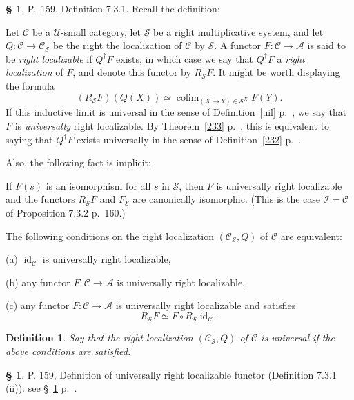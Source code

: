 \documentclass[12pt]{article}%
\newtheorem{df}[thm]{Definition}%
\theoremstyle{remark}
\theoremstyle{definition}
\newtheorem{s}[thm]{\S}%
\newcommand{\nn}{\noindent}
\newcommand{\cc}{\mathcal}
\newcommand{\A}{\mathcal A}
\newcommand{\C}{\mathcal C}
\newcommand{\U}{\mathcal U}
\DeclareMathOperator*{\colim}{colim}
\DeclareMathOperator{\id}{id}
\begin{document}
\begin{s}\label{durl} 
P.~159, Definition 7.3.1. Recall the definition: 

Let $\C$ be a $\U$-small category, %
let $\cc S$ be a right multiplicative system, and let $Q:\C\to\C_{\cc S}$ be the right the localization of $\C$ by $\cc S$. A functor $F:\C\to\A$ is said to be {\em right localizable} if $Q^\dagger F$ exists, in which case we say that $Q^\dagger F$ a {\em right localization} of $F$, and denote this functor by $R_{\cc S}F$. It might be worth displaying the formula 
$$
(R_{\cc S}F)(Q(X))\simeq\colim_{(X\to Y)\in\cc S^X}F(Y).
$$ 
If this inductive limit is universal in the sense of Definition~\ref{uil} p.~\pageref{uil}, we say that $F$ is {\em universally} right localizable.  By Theorem~\ref{233} p.~\pageref{233}, this is equivalent to saying that $Q^\dagger F$ exists universally in the sense of Definition~\ref{232} p.~\pageref{232}. 

Also, the following fact is implicit:

If $F(s)$ is an isomorphism for all $s$ in $\cc S$, then $F$ is universally right localizable and the functors $R_{\cc S}F$ and $F_{\cc S}$ are canonically isomorphic. (This is the case $\cc I=\C$ of Proposition 7.3.2 p.~160.)

The following conditions on the right localization $(\C_{\cc S},Q)$ of $\C$ are equivalent: 

\noindent(a) $\id_\C$ is universally right localizable, 

\noindent(b) any functor $F:\C\to\A$ is universally right localizable, 

\noindent(c) any functor $F:\C\to\A$ is universally right localizable and satisfies 
$$
R_{\cc S}F\simeq F\circ R_{\cc S}\id_\C.
$$

\begin{df}\label{url2}
Say that the right localization $(\C_{\cc S},Q)$ of $\C$ is {\em universal} if the above conditions are satisfied.
\end{df}
\end{s}

%

\begin{s}%
P. 159, Definition of universally right localizable functor (Definition 7.3.1 (ii)): see \S~\ref{durl} p.~\pageref{durl}. 
\end{s}

%

\end{document}
